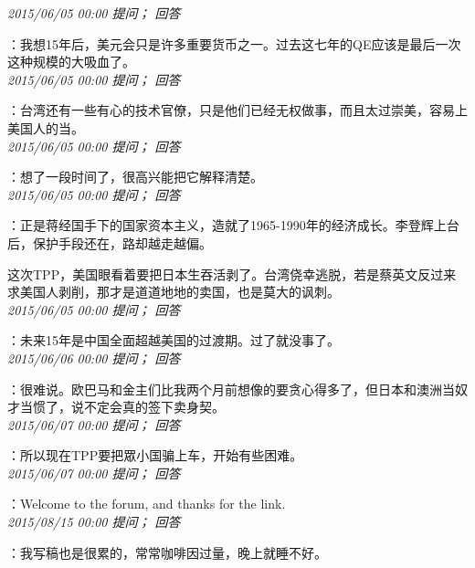 \documentclass[twocolumn]{ctexart}
\begin{document}
\textit{\hfill\noindent\small 2015/06/05 00:00 提问； 回答}

：我想15年后，美元会只是许多重要货币之一。过去这七年的QE应该是最后一次这种规模的大吸血了。\\

\textit{\hfill\noindent\small 2015/06/05 00:00 提问； 回答}

：台湾还有一些有心的技术官僚，只是他们已经无权做事，而且太过崇美，容易上美国人的当。\\

\textit{\hfill\noindent\small 2015/06/05 00:00 提问； 回答}

：想了一段时间了，很高兴能把它解释清楚。\\

\textit{\hfill\noindent\small 2015/06/05 00:00 提问； 回答}

：正是蒋经国手下的国家资本主义，造就了1965-1990年的经济成长。李登辉上台后，保护手段还在，路却越走越偏。

这次TPP，美国眼看着要把日本生吞活剥了。台湾侥幸逃脱，若是蔡英文反过来求美国人剥削，那才是道道地地的卖国，也是莫大的讽刺。\\

\textit{\hfill\noindent\small 2015/06/05 00:00 提问； 回答}

：未来15年是中国全面超越美国的过渡期。过了就没事了。\\

\textit{\hfill\noindent\small 2015/06/06 00:00 提问； 回答}

：很难说。欧巴马和金主们比我两个月前想像的要贪心得多了，但日本和澳洲当奴才当惯了，说不定会真的签下卖身契。\\

\textit{\hfill\noindent\small 2015/06/07 00:00 提问； 回答}

：所以现在TPP要把眾小国骗上车，开始有些困难。\\

\textit{\hfill\noindent\small 2015/06/07 00:00 提问； 回答}

：Welcome to the forum, and thanks for the link.\\

\textit{\hfill\noindent\small 2015/08/15 00:00 提问； 回答}

：我写稿也是很累的，常常咖啡因过量，晚上就睡不好。
\end{document}
